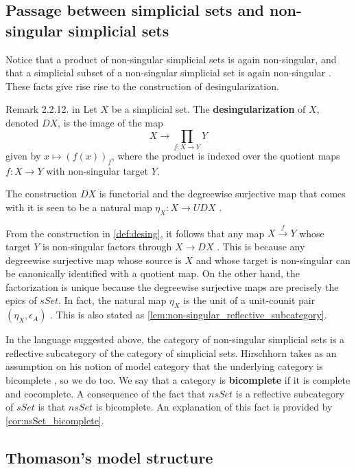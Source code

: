 \subsection{Passage between simplicial sets and non-singular simplicial sets}

Notice that a product of non-singular simplicial sets is again non-singular, and that a simplicial subset of a non-singular simplicial set is again non-singular \cite[Rem.~2.2.12]{WJR13}. These facts give rise rise to the construction of desingularization.
\begin{definition}{Remark 2.2.12. in \cite[p.~39]{WJR13} }
\label{def:desing}
Let $X$ be a simplicial set. The \textbf{desingularization} of $X$, denoted $DX$, is the image of the map
\[X\rightarrow \prod _{f:X\rightarrow Y}Y\]
given by $x\mapsto (f(x))_f$, where the product is indexed over the quotient maps $f:X\rightarrow Y$ with non-singular target $Y$.
\end{definition}
\noindent The construction $DX$ is functorial and the degreewise surjective map that comes with it is seen to be a natural map $\eta _X:X\to UDX$ \cite[Rem.~2.2.12]{WJR13}.

From the construction in \cref{def:desing}, it follows that any map $X\xrightarrow{f} Y$ whose target $Y$ is non-singular factors through $X\to DX$ \cite[Rem.~2.2.12]{WJR13}. This is because any degreewise surjective map whose source is $X$ and whose target is non-singular can be canonically identified with a quotient map. On the other hand, the factorization is unique because the degreewise surjective maps are precisely the epics of $sSet$. In fact, the natural map $\eta _X$ is the unit of a unit-counit pair $(\eta _X,\epsilon _A)$ \cite[Rem.~2.2.12]{WJR13}. This is also stated as \cref{lem:non-singular_reflective_subcategory}.

In the language suggested above, the category of non-singular simplicial sets is a reflective subcategory of the category of simplicial sets. Hirschhorn takes as an assumption on his notion of model category that the underlying category is bicomplete \cite[Def.~7.1.3, p.~109]{Hi03}, so we do too. We say that a category is \textbf{bicomplete} if it is complete and cocomplete. A consequence of the fact that $nsSet$ is a reflective subcategory of $sSet$ is that $nsSet$ is bicomplete. An explanation of this fact is provided by \cref{cor:nsSet_bicomplete}.

\subsection{Thomason's model structure}

